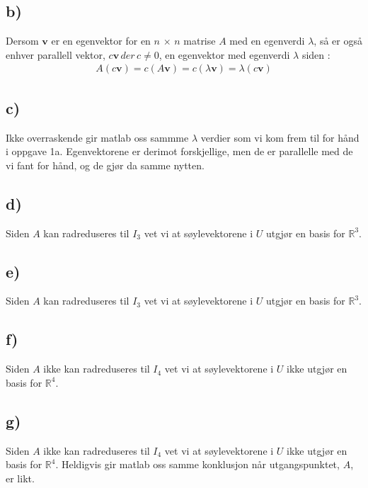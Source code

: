 \documentclass[11pt]{article}
\renewcommand{\vec}[1]{\mathbf{#1}}
\begin{document}
	\subsection*{b)}
		Dersom $\vec{v}$ er en egenvektor for en $n\,\times\,n$ matrise $A$ med en egenverdi $\lambda$, så er også enhver parallell vektor, $c\vec{v} \, der \, c\not=0$, en egenvektor med egenverdi $\lambda$ siden :
	\begin{align*}
	A(c\vec{v}) = c(A\vec{v}) = c(\lambda\vec{v}) = \lambda(c\vec{v})
	\end{align*}
	\subsection*{c)}
		\begin{figure}[H]
			
			
		\end{figure}
		Ikke overraskende gir matlab oss sammme $\lambda$ verdier som vi kom frem til for hånd i oppgave 1a. Egenvektorene er derimot forskjellige, men de er parallelle med de vi fant for hånd, og de gjør da samme nytten.
	\subsection*{d)}
		\begin{figure}[H]
			
			
		\end{figure}
		Siden $A$ kan radreduseres til $I_{3}$ vet vi at søylevektorene i $U$ utgjør en basis for $\mathbb{R}^3$.
	\subsection*{e)}
		\begin{figure}[	H]
			
			
		\end{figure}
		Siden $A$ kan radreduseres til $I_{3}$ vet vi at søylevektorene i $U$ utgjør en basis for $\mathbb{R}^3$.
	\subsection*{f)}
		\begin{figure}[H]
			
			
		\end{figure}
		Siden $A$ ikke kan radreduseres til $I_{4}$ vet vi at søylevektorene i $U$ ikke utgjør en basis for $\mathbb{R}^4$.
	\subsection*{g)}
		\begin{figure}[H]
			
			
		\end{figure}
		Siden $A$ ikke kan radreduseres til $I_{4}$ vet vi at søylevektorene i $U$ ikke utgjør en basis for $\mathbb{R}^4$. Heldigvis gir matlab oss samme konklusjon når utgangspunktet, $A$, er likt.
\end{document}
